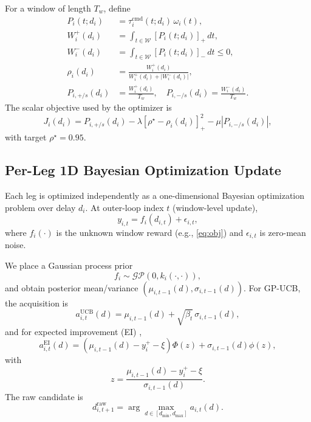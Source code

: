\documentclass[lettersize,journal]{IEEEtran}
\begin{document}
For a window of length $T_w$, define
\begin{align}
P_i(t;d_i) &= \tau^{\mathrm{cmd}}_i(t;d_i)\,\omega_i(t),\\
W_i^+(d_i) &= \int_{t\in\mathcal{W}} [P_i(t;d_i)]_+\,dt,\\
W_i^-(d_i) &= \int_{t\in\mathcal{W}} [P_i(t;d_i)]_-\,dt \le 0,\\
\rho_i(d_i) &= \frac{W_i^+(d_i)}{W_i^+(d_i)+|W_i^-(d_i)|},\\
P_{i,+/s}(d_i) &= \frac{W_i^+(d_i)}{T_w}, \quad
P_{i,-/s}(d_i) = \frac{W_i^-(d_i)}{T_w}.
\end{align}
The scalar objective used by the optimizer is
\begin{equation}
J_i(d_i)=P_{i,+/s}(d_i)-\lambda[\rho^\star-\rho_i(d_i)]_+^2-\mu|P_{i,-/s}(d_i)|,
\label{eq:obj}
\end{equation}
with target $\rho^\star=0.95$.

\subsection{Per-Leg 1D Bayesian Optimization Update}
Each leg is optimized independently as a one-dimensional Bayesian
optimization problem over delay $d_i$.
At outer-loop index $t$ (window-level update),
\begin{equation}
y_{i,t}=f_i(d_{i,t})+\epsilon_{i,t},
\label{eq:obs_model}
\end{equation}
where $f_i(\cdot)$ is the unknown window reward (e.g., \eqref{eq:obj})
and $\epsilon_{i,t}$ is zero-mean noise.

We place a Gaussian process prior
\begin{equation}
f_i \sim \mathcal{GP}(0,k_i(\cdot,\cdot)),
\end{equation}
and obtain posterior mean/variance $(\mu_{i,t-1}(d),\sigma_{i,t-1}(d))$.
For GP-UCB, the acquisition is
\begin{equation}
a^{\mathrm{UCB}}_{i,t}(d)=\mu_{i,t-1}(d)+\sqrt{\beta_t}\,\sigma_{i,t-1}(d),
\label{eq:ucb}
\end{equation}
and for expected improvement (EI) \cite{jones1998ego},
\begin{equation}
a^{\mathrm{EI}}_{i,t}(d)=
(\mu_{i,t-1}(d)-y_i^{+}-\xi)\Phi(z)+\sigma_{i,t-1}(d)\phi(z),
\label{eq:ei}
\end{equation}
with
\begin{equation}
z=\frac{\mu_{i,t-1}(d)-y_i^{+}-\xi}{\sigma_{i,t-1}(d)}.
\end{equation}
The raw candidate is
\begin{equation}
d_{i,t+1}^{\mathrm{raw}}=\arg\max_{d\in[d_{\min},d_{\max}]}
a_{i,t}(d).
\label{eq:raw_pick}
\end{equation}
\end{document}
